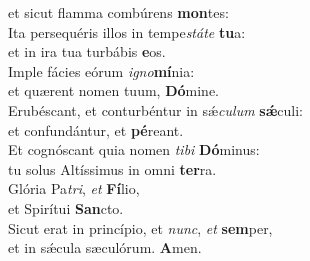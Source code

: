 \oddverse et sicut flamma combúrens \textbf{mon}tes:\\
\evenverse Ita persequéris illos in tempe\textit{stá}\textit{te} \textbf{tu}a:~\*\\
\evenverse et in ira tua turbábis \textbf{e}os.\\
\oddverse Imple fácies eórum \textit{i}\textit{gno}\textbf{mí}nia:~\*\\
\oddverse et quærent nomen tuum, \textbf{Dó}mine.\\
\evenverse Erubéscant, et conturbéntur in sǽ\textit{cu}\textit{lum} \textbf{sǽ}culi:~\*\\
\evenverse et confundántur, et \textbf{pé}reant.\\
\oddverse Et cognóscant quia nomen \textit{ti}\textit{bi} \textbf{Dó}minus:~\*\\
\oddverse tu solus Altíssimus in omni \textbf{ter}ra.\\
\evenverse Glória Pa\textit{tri}, \textit{et} \textbf{Fí}lio,~\*\\
\evenverse et Spirítui \textbf{San}cto.\\
\oddverse Sicut erat in princípio, et \textit{nunc}, \textit{et} \textbf{sem}per,~\*\\
\oddverse et in sǽcula sæculórum. \textbf{A}men.\\
